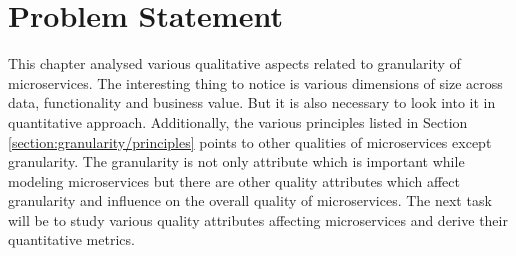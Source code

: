 \section{Problem Statement}\label{section:granularity/problem_statement}
This chapter analysed various qualitative aspects related to granularity of microservices. The interesting thing to notice is various dimensions of size across data, functionality and business value. But it is also necessary to look into it in quantitative approach. Additionally, the various principles listed in Section \ref{section:granularity/principles} points to other qualities of microservices except granularity. The granularity is not only attribute which is important while modeling microservices but there are other quality attributes which affect granularity and influence on the overall quality of microservices. The next task will be to study various quality attributes affecting microservices and derive their quantitative metrics.

 